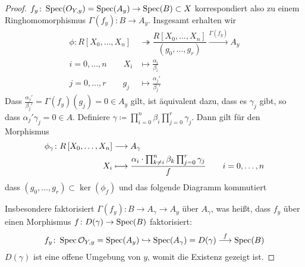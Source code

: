 \documentclass[german]{scrreprt}
\begin{document}
\begin{Lemma}
\begin{proof}
    $f_y\colon\operatorname{Spec}(O_{Y,y})=\operatorname{Spec}(A_y)\to\operatorname{Spec}(B)\subset X$
    korrespondiert also zu einem Ringhomomorphismus
    $\Gamma(f_y)\colon B\to A_y$.
    Insgesamt erhalten wir
    \begin{align*}
      \phi\colon
      R\left[X_0,\dotsc, X_n\right]
      &\twoheadrightarrow
        \dfrac{R\left[X_0,\dotsc, X_n\right]}{\left(g_0,\dotsc, g_r\right)}
        \xrightarrow{\Gamma(f_y)}
        A_y\\
      i=0,\dotsc, n\qquad
      X_i &\longmapsto \frac{\alpha_i}{\beta_i}\\
      j=0,\dotsc, r\qquad
      g_j &\longmapsto \frac{\alpha_j'}{\beta_j'}
    \end{align*}
    Dass $\frac{\alpha_j'}{\beta_j'}=\Gamma(f_y)(g_j)=0\in A_y$ gilt,
    ist äquivalent dazu, dass es $\gamma_j$ gibt, so dass
    $\alpha_j'\gamma_j=0\in A$.
    Definiere
    $\gamma\coloneqq \prod_{i=0}^n \beta_i \prod_{j=0}^r \gamma_j$.
    Dann gilt für den Morphismus
    \begin{align*}
      \phi_\gamma\colon
      R\left[X_0,\dotsc, X_n\right]
      &\longrightarrow
        A_\gamma\\
      X_i
      &\longmapsto
        \dfrac{
        \alpha_i\cdot
        \prod_{k\neq i}^n \beta_k
        \prod_{j=0}^r \gamma_j
        }{f}
        \qquad i=0,\dotsc,n
    \end{align*}
    dass $(g_0, \dotsc, g_r)\subset\ker(\phi_f)$ und das folgende
    Diagramm kommutiert
    \begin{center}
    \end{center}
    Insbesondere faktorisiert $\Gamma(f_y)\colon B\to A_\gamma\to A_y$
    über $A_\gamma$, was heißt, dass $f_y$ über einen Morphismus
    $f\colon D(\gamma)\to\operatorname{Spec}(B)$ faktorisiert:
    \begin{gather*}
      f_y\colon
      \operatorname{Spec}\mathcal{O}_{Y,y}=\operatorname{Spec}(A_y)
      \hookrightarrow \operatorname{Spec}(A_\gamma)=D(\gamma)
      \overset{f}{\longrightarrow} \operatorname{Spec}(B)
    \end{gather*}
    $D(\gamma)$ ist eine offene Umgebung von $y$, womit die Existenz
    gezeigt ist.
  \end{proof}
\end{Lemma}
\end{document}
